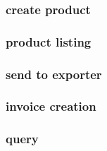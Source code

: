 \subsubsection{create product}

\subsubsection{product listing}

\subsubsection{send to exporter}

\subsubsection{invoice creation}

\subsubsection{query}









